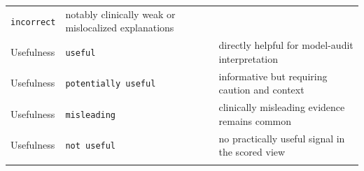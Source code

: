 \begin{longtable}[]{@{}lll@{}}
\begin{minipage}[t]{0.20\columnwidth}
		\texttt{incorrect}\strut
	\end{minipage} & \begin{minipage}[t]{0.40\columnwidth}\raggedright
		notably clinically weak or mislocalized explanations\strut
	\end{minipage}\tabularnewline
	\begin{minipage}[t]{0.20\columnwidth}\raggedright
		Usefulness\strut
	\end{minipage} & \begin{minipage}[t]{0.20\columnwidth}\raggedright
		\texttt{useful}\strut
	\end{minipage} & \begin{minipage}[t]{0.40\columnwidth}\raggedright
		directly helpful for model-audit interpretation\strut
	\end{minipage}\tabularnewline
	\begin{minipage}[t]{0.20\columnwidth}\raggedright
		Usefulness\strut
	\end{minipage} & \begin{minipage}[t]{0.20\columnwidth}\raggedright
		\texttt{potentially \allowbreak useful}\strut
	\end{minipage} & \begin{minipage}[t]{0.40\columnwidth}\raggedright
		informative but requiring caution and context\strut
	\end{minipage}\tabularnewline
	\begin{minipage}[t]{0.20\columnwidth}\raggedright
		Usefulness\strut
	\end{minipage} & \begin{minipage}[t]{0.20\columnwidth}\raggedright
		\texttt{misleading}\strut
	\end{minipage} & \begin{minipage}[t]{0.40\columnwidth}\raggedright
		clinically misleading evidence remains common\strut
	\end{minipage}\tabularnewline
	\begin{minipage}[t]{0.20\columnwidth}\raggedright
		Usefulness\strut
	\end{minipage} & \begin{minipage}[t]{0.20\columnwidth}\raggedright
		\texttt{not \allowbreak useful}\strut
	\end{minipage} & \begin{minipage}[t]{0.40\columnwidth}\raggedright
		no practically useful signal in the scored view\strut
	\end{minipage}\tabularnewline
	\bottomrule
	\label{table:4-4}
\end{longtable}

